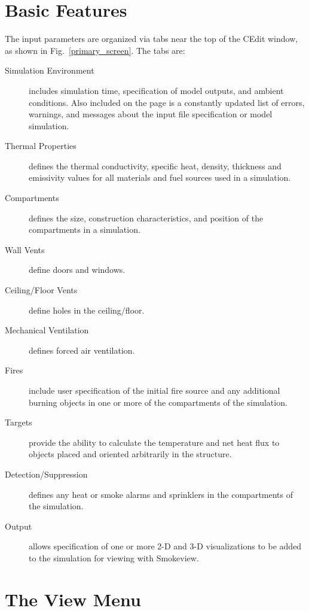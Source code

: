 \section{Basic Features}

The input parameters are organized via tabs near the top of the CEdit window, as shown in Fig.~\ref{primary_screen}. The tabs are:
\begin{description}
\item[Simulation Environment] includes simulation time, specification of model outputs, and ambient conditions. Also included on the page is a constantly updated list of errors, warnings, and messages about the input file specification or model simulation.
\item[Thermal Properties] defines the thermal conductivity, specific heat, density, thickness and emissivity values for all materials and fuel sources used in a simulation.
\item[Compartments] defines the size, construction characteristics, and position of the compartments in a simulation.
\item[Wall Vents] define doors and windows.
\item[Ceiling/Floor Vents] define holes in the ceiling/floor.
\item[Mechanical Ventilation] defines forced air ventilation.
\item[Fires] include user specification of the initial fire source and any additional burning objects in one or more of the compartments of the simulation.
\item[Targets] provide the ability to calculate the temperature and net heat flux to objects placed and oriented arbitrarily in the structure.
\item[Detection/Suppression] defines any heat or smoke alarms and sprinklers in the compartments of the simulation.
\item[Output] allows specification of one or more 2-D and 3-D visualizations to be added to the simulation for viewing with Smokeview. 
\end{description}


\section{The View Menu}

